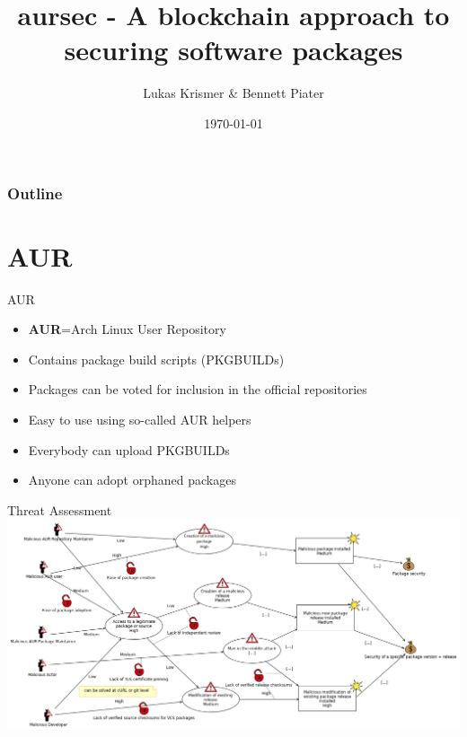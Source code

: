\documentclass{beamer}
\title{aursec - A blockchain approach to securing software packages}
\author{Lukas Krismer \& Bennett Piater}
\institute{Universität Innsbruck - QE - Christian Sillaber}
\date{\today}
\begin{document}
\maketitle


\begin{frame}
	\frametitle{Outline}
	\tableofcontents
\end{frame}

\section{AUR}

\begin{frame}{AUR}
\begin{itemize}
	\item \textbf{AUR}=\alert{A}rch Linux \alert{U}ser \alert{R}epository
	\item Contains package build scripts (PKGBUILDs)
	\item Packages can be voted for inclusion in the official repositories
	\item Easy to use using so-called AUR helpers
	\item Everybody can upload PKGBUILDs
	\item Anyone can adopt orphaned packages
\end{itemize}
\end{frame}

\begin{frame}{Threat Assessment}
\includegraphics[width=\textwidth]{threat.png}
\end{frame}
\end{document}
